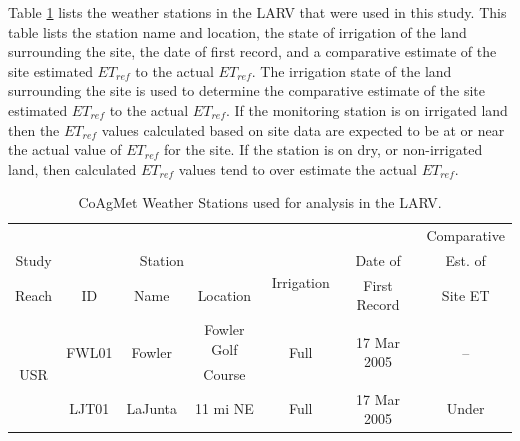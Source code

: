 \begin{linenumbers}
Table \ref{tab:CoAgMet} lists the weather stations in the LARV that were used in this study.  This table lists the station name and location, the state of irrigation of the land surrounding the site, the date of first record, and a comparative estimate of the site estimated $ET_{ref}$ to the actual $ET_{ref}$.  The irrigation state of the land surrounding the site is used to determine the comparative estimate of the site estimated $ET_{ref}$ to the actual  $ET_{ref}$.  If the monitoring station is on irrigated land then the $ET_{ref}$ values calculated based on site data are expected to be at or near the actual value of $ET_{ref}$ for the site.  If the station is on dry, or non-irrigated land, then calculated $ET_{ref}$ values tend to over estimate the actual $ET_{ref}$.

\begin{table}[htb]
  \centering
  \caption[CoAgMet Weather Stations used for analysis in the LARV.]{CoAgMet Weather Stations used for analysis in the LARV.}
  \label{tab:CoAgMet}
    \begin{tabular}{ccccccc}
    	\toprule
    	                         &                           &                                &                &                             &                                 &        Comparative        \\
    	         Study           &                        \multicolumn{3}{c}{Station }                         & \multirow{2}{*}{Irrigation} &             Date of             &          Est. of          \\
    	\cmidrule{2-4}
    Reach &            ID             &              Name              &    Location    &                             &          First Record           &          Site ET          \\ \toprule
    	\multirow{7}[0]{*}{USR}  & \multirow{2}[0]{*}{FWL01} &   \multirow{2}[0]{*}{Fowler}   &  Fowler Golf   &  \multirow{2}[0]{*}{Full}   & \multirow{2}[0]{*}{17 Mar 2005} &  \multirow{2}[0]{*}{--}   \\
    	                         &                           &                                &     Course     &                             &                                 &  \\
    	     \cmidrule{2-7}      & \multirow{2}[0]{*}{LJT01} &  \multirow{2}[0]{*}{LaJunta}   &    11 mi NE    &  \multirow{2}[0]{*}{Full}   & \multirow{2}[0]{*}{17 Mar 2005} & \multirow{2}[0]{*}{Under} \\

\end{tabular}
\end{table}
\end{linenumbers}
